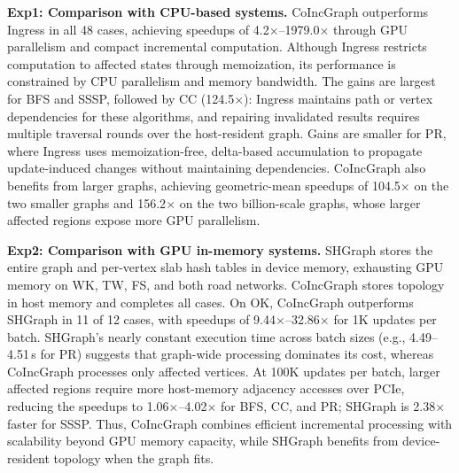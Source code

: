 \textbf{Exp1: Comparison with CPU-based systems.} CoIncGraph outperforms Ingress in all 48 cases, achieving speedups of 4.2$\times$--1979.0$\times$ through GPU parallelism and compact incremental computation. Although Ingress restricts computation to affected states through memoization, its performance is constrained by CPU parallelism and memory bandwidth. The gains are largest for BFS and SSSP, followed by CC (124.5$\times$): Ingress maintains path or vertex dependencies for these algorithms, and repairing invalidated results requires multiple traversal rounds over the host-resident graph. Gains are smaller for PR, where Ingress uses memoization-free, delta-based accumulation to propagate update-induced changes without maintaining dependencies. CoIncGraph also benefits from larger graphs, achieving geometric-mean speedups of 104.5$\times$ on the two smaller graphs and 156.2$\times$ on the two billion-scale graphs, whose larger affected regions expose more GPU parallelism.




\textbf{Exp2: Comparison with GPU in-memory systems.} SHGraph stores the entire graph and per-vertex slab hash tables in device memory, exhausting GPU memory on WK, TW, FS, and both road networks. CoIncGraph stores topology in host memory and completes all cases. On OK, CoIncGraph outperforms SHGraph in 11 of 12 cases, with speedups of 9.44$\times$--32.86$\times$ for 1K updates per batch. SHGraph's nearly constant execution time across batch sizes (e.g., 4.49--4.51\,s for PR) suggests that graph-wide processing dominates its cost, whereas CoIncGraph processes only affected vertices. At 100K updates per batch, larger affected regions require more host-memory adjacency accesses over PCIe, reducing the speedups to 1.06$\times$--4.02$\times$ for BFS, CC, and PR; SHGraph is 2.38$\times$ faster for SSSP. Thus, CoIncGraph combines efficient incremental processing with scalability beyond GPU memory capacity, while SHGraph benefits from device-resident topology when the graph fits.

